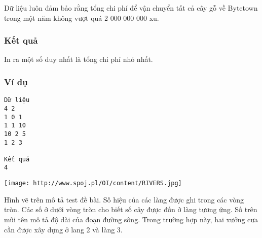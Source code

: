    Dữ liệu luôn đảm bảo rằng tổng chi phí để vận chuyển tất cả cây gỗ về Bytetown trong một năm không vượt quá 2 000 000 000 xu.  

\subsubsection{   Kết quả  }

   In ra một số duy nhất là tổng chi phí nhỏ nhất.  

\subsubsection{   Ví dụ  }
\begin{verbatim}
Dữ liệu
4 2
1 0 1
1 1 10
10 2 5
1 2 3

Kết quả
4
\end{verbatim}
\texttt{[image: http://www.spoj.pl/OI/content/RIVERS.jpg]}

   Hình vẽ trên mô tả test đề bài. Số hiệu của các làng được ghi trong các vòng tròn. Các số ở dưới vòng tròn cho biết số cây được đốn ở làng tương ứng. Số trên mũi tên mô tả độ dài của đoạn đường sông. Trong trường hợp này, hai xưởng cưa cần được xây dựng ở lang 2 và làng 3.  
